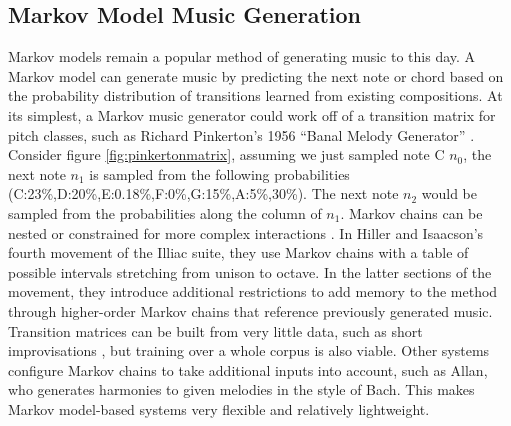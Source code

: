 \subsection{Markov Model Music Generation}
Markov models remain a popular method of generating music to this day. A Markov model can generate music by predicting the next note or chord based on the probability distribution of transitions learned from existing compositions. At its simplest, a Markov music generator could work off of a transition matrix for pitch classes, such as Richard Pinkerton’s 1956 “Banal Melody Generator” \cite{Pinkerton_1956}. Consider figure \ref{fig:pinkertonmatrix}, assuming we just sampled note C $n_0$, the next note $n_1$ is sampled from the following probabilities (C:23\%,D:20\%,E:0.18\%,F:0\%,G:15\%,A:5\%,30\%). The next note $n_2$ would be sampled from the probabilities along the column of $n_1$. 
Markov chains can be nested or constrained for more complex interactions \cite{Collins_Laney_2017}. In Hiller and Isaacson's \cite{Hiller_Isaacson_1959} fourth movement of the Illiac suite, they use Markov chains with a table of possible intervals stretching from unison to octave. In the latter sections of the movement, they introduce additional restrictions to add memory to the method through higher-order Markov chains that reference previously generated music. 
Transition matrices can be built from very little data, such as short improvisations \cite{Pachet_2003}, but training over a whole corpus is also viable. Other systems configure Markov chains to take additional inputs into account, such as Allan, \cite{Allan_2002} who generates harmonies to given melodies in the style of Bach. This makes Markov model-based systems very flexible and relatively lightweight.

